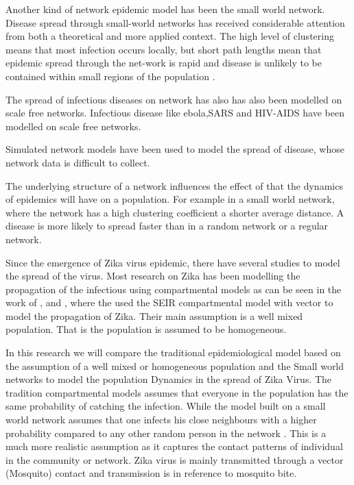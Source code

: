 Another kind of network epidemic model has been the small world network. Disease spread through small-world networks has received considerable attention from both a theoretical and more applied context. The high level of clustering means that most infection occurs locally, but short path lengths mean that epidemic spread through the net-work is rapid and disease is unlikely to be contained within small regions of the population \citep{watts1998collective}.

The spread of infectious diseases on network has also has also been modelled on scale free networks. Infectious disease like ebola,SARS and HIV-AIDS have been modelled on scale free networks. \citep{morita2016six}


Simulated network models have been used to model the spread of disease, whose network data is difficult to collect.


 The underlying structure of a network influences  the effect of that the dynamics of epidemics will have on a population. For example in a small world network, where the network has a high clustering coefficient a shorter average distance. A disease is more likely to spread faster than in a random network or a regular network.


Since the emergence of Zika virus epidemic, there have several studies to model the spread of the virus. Most research on Zika has been modelling the propagation of the infectious using compartmental models as can be seen in the work of \cite{1}, \cite{2} and \cite{3}, where the used the SEIR compartmental model with vector to model the propagation of Zika. Their main assumption is a well mixed population. That is the population is assumed to be homogeneous.
 
In this research we will compare the traditional epidemiological model based on the  assumption of a well mixed or homogeneous population and the Small world networks to model the population Dynamics in the spread of Zika Virus. The tradition compartmental models assumes that everyone in the population has the same probability of catching the infection. While  the model built on a small world network assumes that  one infects his close neighbours with a higher probability compared to any other random person in the network \citep{newman2002random}. This is a much more realistic assumption as it captures the contact patterns of individual in the community or network. Zika virus is mainly transmitted through a vector (Mosquito) contact and transmission is in reference to mosquito bite.



